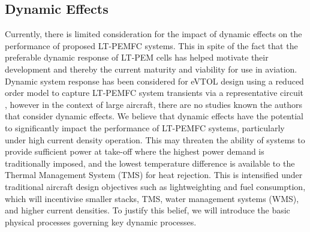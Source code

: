 \subsection{Dynamic Effects} \label{sec:dyn}
Currently, there is limited consideration for the impact of dynamic effects on the performance of proposed LT-PEMFC systems.
This in spite of the fact that the preferable dynamic response of LT-PEM cells has helped motivate their development and thereby the current maturity and viability for use in aviation.
Dynamic system response has been considered for eVTOL design using a reduced order model to capture LT-PEMFC system transients via a representative circuit \cite{ngHydrogenFuelCells2019a}, however in the context of large aircraft, there are no studies known the authors that consider dynamic effects.
We believe that dynamic effects have the potential to significantly impact the performance of LT-PEMFC systems, particularly under high current density operation.
This may threaten the ability of systems to provide sufficient power at take-off where the highest power demand is traditionally imposed, and the lowest temperature difference is available to the Thermal Management System (TMS) for heat rejection.
This is intensified under  traditional aircraft design objectives such as lightweighting and fuel consumption, which will incentivise smaller stacks, TMS, water management systems (WMS), and higher current densities.
To justify this belief, we will introduce the basic physical processes governing key dynamic processes.

